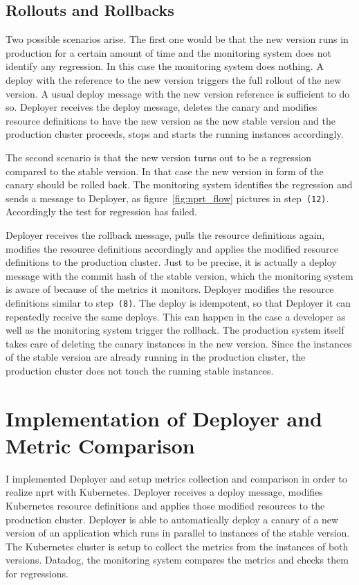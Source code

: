 \section{Rollouts and Rollbacks}

Two possible scenarios arise. The first one would be that the new version runs in
production for a certain amount of time and the monitoring system does not identify any
regression. In this case the monitoring system does nothing. A deploy with the reference
to the new version triggers the full rollout of the new version. A usual deploy message
with the new version reference is sufficient to do so. Deployer receives the deploy
message, deletes the canary and modifies resource definitions to have the new version as
the new stable version and the production cluster proceeds, stops and starts the running
instances accordingly.

The second scenario is that the new version turns out to be a regression compared to the
stable version. In that case the new version in form of the canary should be rolled
back. The monitoring system identifies the regression and sends a message to Deployer, as
figure~\ref{fig:nprt_flow} pictures in step~\texttt{(12)}. Accordingly the test for
regression has failed.

Deployer receives the rollback message, pulls the resource definitions again, modifies the
resource definitions accordingly and applies the modified resource definitions to the
production cluster. Just to be precise, it is actually a deploy message with the commit
hash of the stable version, which the monitoring system is aware of because of the metrics
it monitors. Deployer modifies the resource definitions similar to step~\texttt{(8)}. The
deploy is idempotent, so that Deployer it can repeatedly receive the same deploys. This
can happen in the case a developer as well as the monitoring system trigger the
rollback. The production system itself takes care of deleting the canary instances in the
new version. Since the instances of the stable version are already running in the
production cluster, the production cluster does not touch the running stable instances.

\chapter{Implementation of Deployer and Metric Comparison}
\label{chap:detail}

I implemented Deployer and setup metrics collection and comparison in order to realize
\gls{nprt} with Kubernetes. Deployer receives a deploy message, modifies Kubernetes
resource definitions and applies those modified resources to the production
cluster. Deployer is able to automatically deploy a canary of a new version of an
application which runs in parallel to instances of the stable version. The Kubernetes
cluster is setup to collect the metrics from the instances of both versions. Datadog, the
monitoring system compares the metrics and checks them for regressions.

